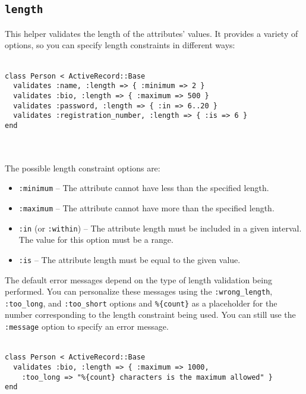 \documentclass[10pt]{book}
\begin{document}
\subsection{ \texttt{length}}

This helper validates the length of the attributes’ values. It  provides a variety of options, so you can specify length constraints in  different ways:
\\ \\
\begin{minipage}{\textwidth}{\scriptsize
\begin{verbatim}
class Person < ActiveRecord::Base
  validates :name, :length => { :minimum => 2 }
  validates :bio, :length => { :maximum => 500 }
  validates :password, :length => { :in => 6..20 }
  validates :registration_number, :length => { :is => 6 }
end
\end{verbatim}}
\end{minipage}
\\ \\

The possible length constraint options are:
\begin{itemize}
	\item \texttt{:minimum} – The attribute cannot have less than the specified length.
	\item \texttt{:maximum} – The attribute cannot have more than the specified length.
	\item \texttt{:in} (or \texttt{:within}) – The attribute length must be included in a given interval. The value for this option must be a range.
	\item \texttt{:is} – The attribute length must be equal to the given value.
\end{itemize}

The default error messages depend on the type of length validation  being performed. You can personalize these messages using the \texttt{:wrong\_length}, \texttt{:too\_long}, and \texttt{:too\_short} options and \texttt{\%\{count\}} as a placeholder for the number corresponding to the length constraint being used. You can still use the \texttt{:message} option to specify an error message.
\\ \\
\begin{minipage}{\textwidth}{\scriptsize
\begin{verbatim}
class Person < ActiveRecord::Base
  validates :bio, :length => { :maximum => 1000,
    :too_long => "%{count} characters is the maximum allowed" }
end
\end{verbatim}}
\end{minipage}
\\ \\
\end{document}
